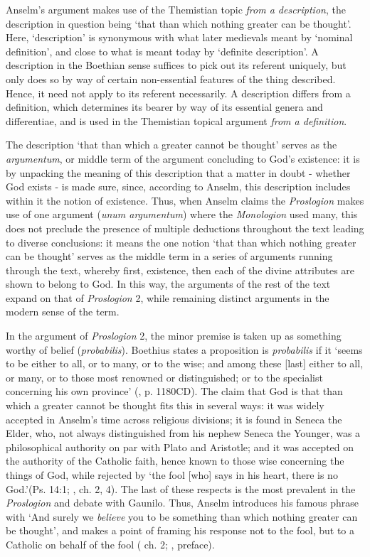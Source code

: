 \documentclass[]{birkjour}
\begin{document}
Anselm's argument makes use of the Themistian topic \textit{from a description}, the description in question being `that than which nothing greater can be thought'. Here, `description' is synonymous with what later medievals meant by `nominal definition', and close to what is meant today by `definite description'. A description in the Boethian sense suffices to pick out its referent uniquely, but only does so by way of certain non-essential features of the thing described. Hence, it need not apply to its referent necessarily. A description differs from a definition, which determines its bearer by way of its essential genera and differentiae, and is used in the Themistian topical argument \textit{from a definition}. 
	
The description `that than which a greater cannot be thought' serves as the \textit{argumentum}, or middle term of the argument concluding to God's existence: it is by unpacking the meaning of this description that a matter in doubt - whether God exists - is made sure, since, according to Anselm, this description includes within it the notion of existence. Thus, when Anselm claims the \textit{Proslogion} makes use of one argument (\textit{unum argumentum}) where the \textit{Monologion} used many, this does not preclude the presence of multiple deductions throughout the text leading to diverse conclusions: it means the one notion `that than which nothing greater can be thought' serves as the middle term in a series of arguments running through the text, whereby first, existence, then each of the divine attributes are shown to belong to God. In this way, the arguments of the rest of the text expand on that of \textit{Proslogion} 2, while remaining distinct arguments in the modern sense of the term.
	
In the argument of \textit{Proslogion} 2, the minor premise is taken up as something worthy of belief (\textit{probabilis}). Boethius states a proposition is \textit{probabilis} if it `seems to be either to all, or to many, or to the wise; and among these [last] either to all, or many, or to those most renowned or distinguished; or to the specialist concerning his own province' (\cite{BDT}, p. 1180CD). The claim that God is that than which a greater cannot be thought fits this in several ways: it was widely accepted in Anselm's time across religious divisions; it is found in Seneca the Elder, who, not always distinguished from his nephew Seneca the Younger, was a philosophical authority on par with Plato and Aristotle; and it was accepted on the authority of the Catholic faith, hence known to those wise concerning the things of God, while rejected by `the fool [who] says in his heart, there is no God.'(Ps. 14:1; \cite{AnselmPros}, ch. 2, 4). The last of these respects is the most prevalent in the \textit{Proslogion} and debate with Gaunilo. Thus, Anselm introduces his famous phrase with `And surely we \textit{believe} you to be something than which nothing greater can be thought', and makes a point of framing his response not to the fool, but to a Catholic on behalf of the fool (\cite{AnselmPros} ch. 2; \cite{AnselmResp}, preface). 
	
\end{document}
